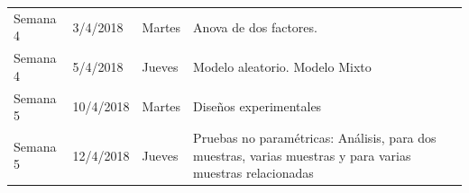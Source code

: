 \documentclass[]{book}
\theoremstyle{definition}
\theoremstyle{definition}
\theoremstyle{definition}
\theoremstyle{remark}
\begin{document}
\begin{longtable}[]{@{}llll@{}}
\begin{minipage}[t]{0.07\columnwidth}
Semana 4\strut
\end{minipage} & \begin{minipage}[t]{0.07\columnwidth}\raggedright
3/4/2018\strut
\end{minipage} & \begin{minipage}[t]{0.05\columnwidth}\raggedright
Martes\strut
\end{minipage} & \begin{minipage}[t]{0.69\columnwidth}\raggedright
Anova de dos factores.\strut
\end{minipage}\tabularnewline
\begin{minipage}[t]{0.07\columnwidth}\raggedright
Semana 4\strut
\end{minipage} & \begin{minipage}[t]{0.07\columnwidth}\raggedright
5/4/2018\strut
\end{minipage} & \begin{minipage}[t]{0.05\columnwidth}\raggedright
Jueves\strut
\end{minipage} & \begin{minipage}[t]{0.69\columnwidth}\raggedright
Modelo aleatorio. Modelo Mixto\strut
\end{minipage}\tabularnewline
\begin{minipage}[t]{0.07\columnwidth}\raggedright
Semana 5\strut
\end{minipage} & \begin{minipage}[t]{0.07\columnwidth}\raggedright
10/4/2018\strut
\end{minipage} & \begin{minipage}[t]{0.05\columnwidth}\raggedright
Martes\strut
\end{minipage} & \begin{minipage}[t]{0.69\columnwidth}\raggedright
Diseños experimentales\strut
\end{minipage}\tabularnewline
\begin{minipage}[t]{0.07\columnwidth}\raggedright
Semana 5\strut
\end{minipage} & \begin{minipage}[t]{0.07\columnwidth}\raggedright
12/4/2018\strut
\end{minipage} & \begin{minipage}[t]{0.05\columnwidth}\raggedright
Jueves\strut
\end{minipage} & \begin{minipage}[t]{0.69\columnwidth}\raggedright
Pruebas no paramétricas: Análisis, para dos muestras, varias muestras y
para varias muestras relacionadas\strut

\end{minipage}
\end{longtable}
\end{document}
